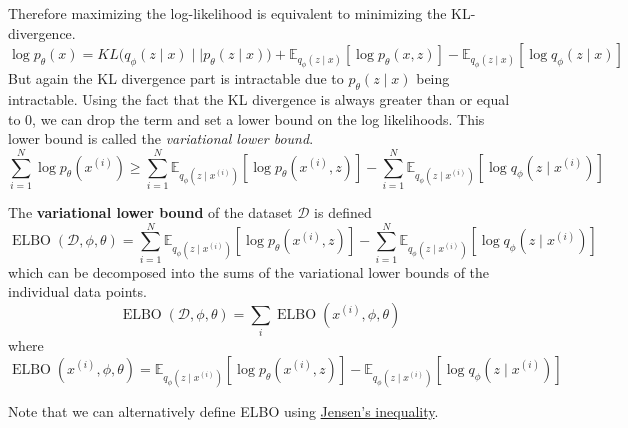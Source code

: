 \documentclass{article}
\DeclareMathOperator{\elbo}{ELBO}
\begin{document}
  Therefore maximizing the log-likelihood is equivalent to minimizing the KL-divergence. 
  \begin{equation}
    \log p_\theta (x) = KL \big( q_\phi (z \mid x) \mid\mid p_{\theta} (z \mid x) \big) + \mathbb{E}_{q_{\phi} (z \mid x)} [\log p_{\theta} (x, z)] - \mathbb{E}_{q_\phi(z \mid x)} [ \log q_{\phi} (z \mid x)]
  \end{equation}
  But again the KL divergence part is intractable due to $p_\theta (z \mid x)$ being intractable. Using the fact that the KL divergence is always greater than or equal to $0$, we can drop the term and set a lower bound on the log likelihoods. This lower bound is called the \textit{variational lower bound}.  
  \begin{equation}
    \sum_{i=1}^N \log p_{\theta} (x^{(i)}) \geq \sum_{i=1}^N \mathbb{E}_{q_\phi (z \mid x^{(i)})} [ \log p_{\theta} (x^{(i)}, z)] - \sum_{i=1}^N \mathbb{E}_{q_{\phi} (z \mid x^{(i)})} [ \log q_{\phi} (z \mid x^{(i)}) ]
  \end{equation} 

  \begin{definition}
    \label{def:variational-lower-bound}
    The \textbf{variational lower bound} of the dataset $\mathcal{D}$ is defined 
    \begin{equation}
      \elbo(\mathcal{D}, \phi, \theta) = \sum_{i=1}^N \mathbb{E}_{q_\phi (z \mid x^{(i)})} [ \log p_{\theta} (x^{(i)}, z)] - \sum_{i=1}^N \mathbb{E}_{q_{\phi} (z \mid x^{(i)})} [ \log q_{\phi} (z \mid x^{(i)})] 
    \end{equation}
    which can be decomposed into the sums of the variational lower bounds of the individual data points. 
    \begin{equation}
      \elbo(\mathcal{D}, \phi, \theta) = \sum_i \elbo(x^{(i)}, \phi, \theta) 
    \end{equation}
    where 
    \begin{equation}
      \elbo(x^{(i)}, \phi, \theta) = \mathbb{E}_{q_\phi (z \mid x^{(i)})} [ \log p_{\theta} (x^{(i)}, z)] - \mathbb{E}_{q_{\phi} (z \mid x^{(i)})} [ \log q_{\phi} (z \mid x^{(i)})] 
    \end{equation}
  \end{definition}

  Note that we can alternatively define ELBO using \hyperref[com-thm:jensens-inequality]{Jensen's inequality}. 
\end{document}
